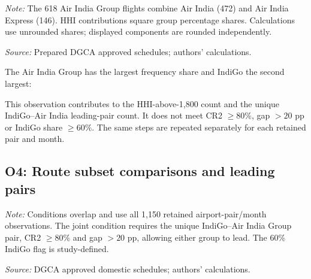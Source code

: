 \documentclass[12pt,a4paper]{article}
\begin{document}
\begin{minipage}{\linewidth}
\captionsetup{font=small,labelfont=bf,justification=raggedright,singlelinecheck=false,hypcap=false}
\label{tab:o4-route-worked}
\centering
{\small{}\par}
\vspace{4pt}
{\footnotesize{}\raggedright\textit{Note:} The 618 Air India Group flights combine Air India (472) and Air India Express (146). HHI contributions square group percentage shares. Calculations use unrounded shares; displayed components are rounded independently.\par
\textit{Source:} Prepared DGCA approved schedules; authors' calculations.\par}
\end{minipage}

The Air India Group has the largest frequency share and IndiGo the second largest:

This observation contributes to the HHI-above-1,800 count and the unique IndiGo--Air India leading-pair count. It does not meet CR2 $\geq80\%$, gap $>20$ pp or IndiGo share $\geq60\%$. The same steps are repeated separately for each retained pair and month.

\clearpage
\subsection{O4: Route subset comparisons and leading pairs}
\label{app:o4-route-checks}

\medskip
\begin{minipage}{\linewidth}
\captionsetup{font=small,labelfont=bf,justification=raggedright,singlelinecheck=false,hypcap=false}
\label{tab:o4-route-complete}
\centering
{\small{}\setlength{\tabcolsep}{4pt}\par}
\vspace{4pt}
{\footnotesize{}\raggedright\textit{Note:} Conditions overlap and use all 1,150 retained airport-pair/month observations. The joint condition requires the unique IndiGo--Air India Group pair, CR2 $\geq80\%$ and gap $>20$ pp, allowing either group to lead. The 60\% IndiGo flag is study-defined.\par
\textit{Source:} DGCA approved domestic schedules; authors' calculations.\par}
\end{minipage}
\end{document}
